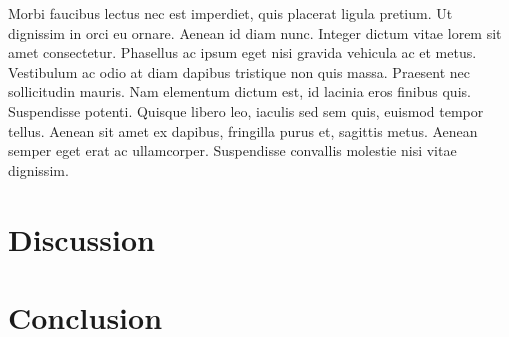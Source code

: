 Morbi faucibus lectus nec est imperdiet, quis placerat ligula pretium. Ut dignissim in orci eu ornare. Aenean id diam nunc. Integer dictum vitae lorem sit amet consectetur. Phasellus ac ipsum eget nisi gravida vehicula ac et metus. Vestibulum ac odio at diam dapibus tristique non quis massa. Praesent nec sollicitudin mauris. Nam elementum dictum est, id lacinia eros finibus quis. Suspendisse potenti. Quisque libero leo, iaculis sed sem quis, euismod tempor tellus. Aenean sit amet ex dapibus, fringilla purus et, sagittis metus. Aenean semper eget erat ac ullamcorper. Suspendisse convallis molestie nisi vitae dignissim.



\chapter{Discussion}

\chapter{Conclusion}
\label{sec:conclusion}

